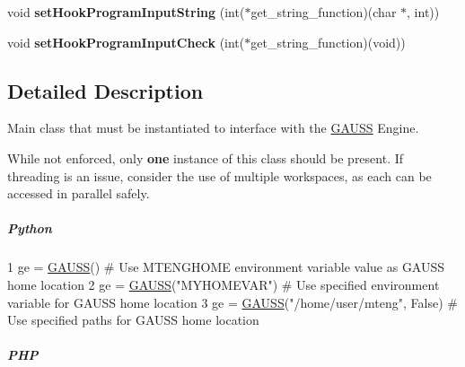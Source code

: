 \begin{DoxyCompactItemize}
\item 
\hypertarget{class_g_a_u_s_s_ae3f5de6a0e0c2b5caf64e8612b353797}{void {\bfseries set\-Hook\-Program\-Input\-String} (int($\ast$get\-\_\-string\-\_\-function)(char $\ast$, int))}\label{class_g_a_u_s_s_ae3f5de6a0e0c2b5caf64e8612b353797}

\item 
\hypertarget{class_g_a_u_s_s_a3231521365d093e05eec48bde7f25b7f}{void {\bfseries set\-Hook\-Program\-Input\-Check} (int($\ast$get\-\_\-string\-\_\-function)(void))}\label{class_g_a_u_s_s_a3231521365d093e05eec48bde7f25b7f}

\end{DoxyCompactItemize}


\subsection{Detailed Description}
Main class that must be instantiated to interface with the \hyperlink{class_g_a_u_s_s}{G\-A\-U\-S\-S} Engine. 

While not enforced, only {\bfseries one} instance of this class should be present. If threading is an issue, consider the use of multiple workspaces, as each can be accessed in parallel safely.

\subparagraph*{Python}


\begin{DoxyCode}
1 ge = \hyperlink{class_g_a_u_s_s}{GAUSS}() \textcolor{comment}{# Use MTENGHOME environment variable value as GAUSS home location}
2 ge = \hyperlink{class_g_a_u_s_s}{GAUSS}(\textcolor{stringliteral}{"MYHOMEVAR"}) \textcolor{comment}{# Use specified environment variable for GAUSS home location}
3 ge = \hyperlink{class_g_a_u_s_s}{GAUSS}(\textcolor{stringliteral}{"/home/user/mteng"}, \textcolor{keyword}{False}) \textcolor{comment}{# Use specified paths for GAUSS home location}
\end{DoxyCode}


\subparagraph*{P\-H\-P}


 

